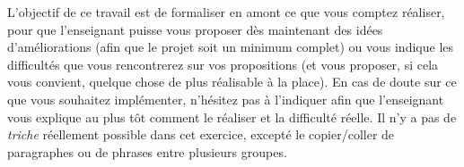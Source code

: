 \bigskip

\noindent L'objectif de ce travail est de formaliser en amont ce que vous comptez réaliser, pour que l'enseignant puisse vous proposer dès maintenant des idées d'améliorations (afin que le projet soit un minimum complet) ou vous indique les difficultés que vous rencontrerez sur vos propositions (et vous proposer, si cela vous convient, quelque chose de plus réalisable à la place).
En cas de doute sur ce que vous souhaitez implémenter, n'hésitez pas à l'indiquer afin que l'enseignant vous explique au plus tôt comment le réaliser et la difficulté réelle.
Il n'y a pas de \textit{triche} réellement possible dans cet exercice, excepté le copier/coller de paragraphes ou de phrases entre plusieurs groupes.
